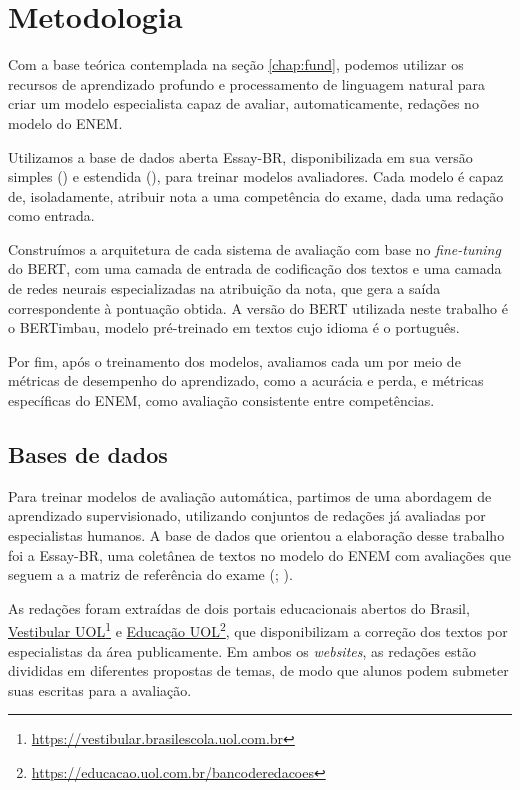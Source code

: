 \chapter{Metodologia}
\label{chap:work}

Com a base teórica contemplada na seção \ref{chap:fund}, podemos utilizar os recursos de aprendizado profundo e processamento de linguagem natural para criar um modelo especialista capaz de avaliar, automaticamente, redações no modelo do ENEM.

Utilizamos a base de dados aberta Essay-BR, disponibilizada em sua versão simples (\cite{marinho-et-al-21}) e estendida (\cite{marinho-et-al-22}), para treinar modelos avaliadores. Cada modelo é capaz de, isoladamente, atribuir nota a uma competência do exame, dada uma redação como entrada. %

Construímos a arquitetura de cada sistema de avaliação com base no \textit{fine-tuning} do BERT, com uma camada de entrada de codificação dos textos e uma camada de redes neurais especializadas na atribuição da nota, que gera a saída correspondente à pontuação obtida. A versão do BERT utilizada neste trabalho é o BERTimbau, modelo pré-treinado em textos cujo idioma é o português.

Por fim, após o treinamento dos modelos, avaliamos cada um por meio de métricas de desempenho do aprendizado, como a acurácia e perda, e métricas específicas do ENEM, como avaliação consistente entre competências.

\section{Bases de dados}

Para treinar modelos de avaliação automática, partimos de uma abordagem de aprendizado supervisionado, utilizando conjuntos de redações já avaliadas por especialistas humanos. A base de dados que orientou a elaboração desse trabalho foi a Essay-BR, uma coletânea de textos no modelo do ENEM com avaliações que seguem a a matriz de referência do exame (\cite{marinho-et-al-21}; \cite{marinho-et-al-22}). %

As redações foram extraídas de dois portais educacionais abertos do Brasil, \href{https://vestibular.brasilescola.uol.com.br/banco-de-redacoes}{Vestibular UOL}\footnote{\url{https://vestibular.brasilescola.uol.com.br}} e \href{https://educacao.uol.com.br/bancoderedacoes}{Educação UOL}\footnote{\url{https://educacao.uol.com.br/bancoderedacoes}}, que disponibilizam a correção dos textos por especialistas da área publicamente. Em ambos os \textit{websites}, as redações estão divididas em diferentes propostas de temas, de modo que alunos podem submeter suas escritas para a avaliação.

